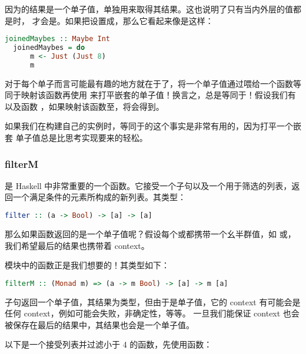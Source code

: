 \documentclass[./main.tex]{subfiles}
\begin{document}
因为的结果是一个单子值，单独用来取得其结果。这也说明了只有当内外层的值都是时，
才会是。如果把设置成，那么它看起来像是这样：

\begin{lstlisting}[language=Haskell]
  joinedMaybes :: Maybe Int
  joinedMaybes = do
      m <- Just (Just 8)
      m
\end{lstlisting}

对于每个单子而言可能最有趣的地方就在于了，将一个单子值通过\acode{>>=}喂给一个函数等同于映射该函数再使用
来打平嵌套的单子值！换言之，总是等同于！假设我们有以及函数
，如果映射该函数至，将会得到。

如果我们在构建自己的实例时，等同于的这个事实是非常有用的，因为打平一个嵌套
单子值总是比思考实现\acode{>>=}要来的轻松。

\subsubsection*{filterM}

是 Haskell 中非常重要的一个函数。它接受一个子句以及一个用于筛选的列表，返回一个满足条件的元素所构成的新列表。其类型：

\begin{lstlisting}[language=Haskell]
  filter :: (a -> Bool) -> [a] -> [a]
\end{lstlisting}

那么如果函数返回的是一个单子值呢？假设每个或都携带一个幺半群值，如
或，我们希望最后的结果也携带着 context。

模块中的函数正是我们想要的！其类型如下：

\begin{lstlisting}[language=Haskell]
  filterM :: (Monad m) => (a -> m Bool) -> [a] -> m [a]
\end{lstlisting}

子句返回一个单子值，其结果为类型，但由于是单子值，它的 context 有可能会是任何 context，例如可能会失败，非确定性，等等。
一旦我们能保证 context 也会被保存在最后的结果中，其结果也会是一个单子值。

以下是一个接受列表并过滤小于 4 的函数，先使用函数：
\end{document}
